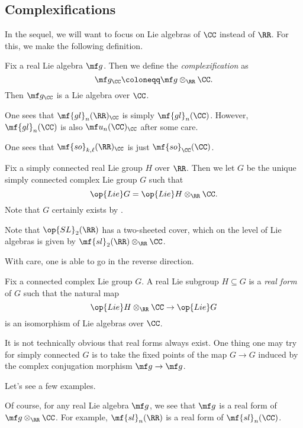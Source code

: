 \documentclass[../notes.tex]{subfiles}
\begin{document}
\subsection{Complexifications}
In the sequel, we will want to focus on Lie algebras of $\CC$ instead of $\RR$. For this, we make the following definition.
\begin{definition}[complexification]
	Fix a real Lie algebra $\mf g$. Then we define the \textit{complexification} as
	\[\mf g_\CC\coloneqq\mf g\otimes_\RR\CC.\]
	Then $\mf g_\CC$ is a Lie algebra over $\CC$.
\end{definition}
\begin{example}
	One sees that $\mf{gl}_n(\RR)_\CC$ is simply $\mf{gl}_n(\CC)$. However, $\mf{gl}_n(\CC)$ is also $\mf u_n(\CC)_\CC$ after some care.
\end{example}
\begin{example}
	One sees that $\mf{so}_{k,\ell}(\RR)_\CC$ is just $\mf{so}_\CC(\CC)$.
\end{example}
\begin{definition}[complexification]
	Fix a simply connected real Lie group $H$ over $\RR$. Then we let $G$ be the unique simply connected complex Lie group $G$ such that
	\[\op{Lie}G=\op{Lie}H\otimes_\RR\CC.\]
	Note that $G$ certainly exists by .
\end{definition}
\begin{example}
	Note that $\op{SL}_2(\RR)$ has a two-sheeted cover, which on the level of Lie algebras is given by $\mf{sl}_2(\RR)\otimes_\RR\CC$. 
\end{example}
With care, one is able to go in the reverse direction.
\begin{definition}
	Fix a connected complex Lie group $G$. A real Lie subgroup $H\subseteq G$ is a \textit{real form} of $G$ such that the natural map
	\[\op{Lie}H\otimes_\RR\CC\to\op{Lie}G\]
	is an isomorphism of Lie algebras over $\CC$.
\end{definition}
\begin{remark}
	It is not technically obvious that real forms always exist. One thing one may try for simply connected $G$ is to take the fixed points of the map $G\to G$ induced by the complex conjugation morphism $\mf g\to\mf g$.
\end{remark}
Let's see a few examples.
\begin{example}
	Of course, for any real Lie algebra $\mf g$, we see that $\mf g$ is a real form of $\mf g\otimes_\RR\CC$. For example, $\mf{sl}_n(\RR)$ is a real form of $\mf{sl}_n(\CC)$.
\end{example}
\end{document}
